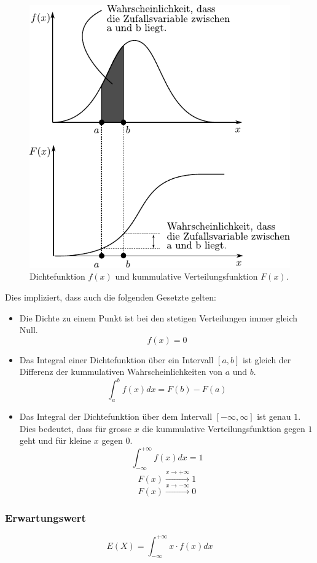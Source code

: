    \begin{figure}[h!]
           \centering
           \includegraphics[scale=\graphscale]{dichtefunktion.pdf}
           \caption{Dichtefunktion $f(x)$ und kummulative Verteilungsfunktion $F(x)$.}
   \end{figure}

\noindent
Dies impliziert, dass auch die folgenden Gesetzte gelten:
\begin{itemize}
	\item Die Dichte zu einem Punkt ist bei den stetigen Verteilungen immer gleich Null.
	\[ f(x) = 0 \]
	\item Das Integral einer Dichtefunktion über ein Intervall $[a,b]$
		ist gleich der Differenz der kummulativen Wahrscheinlichkeiten
		von $a$ und $b$.
	\[ \int_{a}^{b} f(x) d x = F(b) - F(a) \]
	\item Das Integral der Dichtefunktion über dem Intervall 
		$[-\infty,\infty]$ ist genau $1$. Dies bedeutet, dass für
		grosse $x$ die kummulative Verteilungsfunktion gegen $1$ geht
		und für kleine $x$ gegen $0$.
	\[ \int_{-\infty}^{+\infty} f(x) d x = 1 \]
	\[ F(x) \xrightarrow{x \rightarrow +\infty} 1 \]
	\[ F(x) \xrightarrow{x \rightarrow -\infty} 0 \]	
\end{itemize}

\subsubsection{Erwartungswert}
\[ E(X) = \int_{-\infty}^{+\infty} x \cdot f(x) d x  \]

